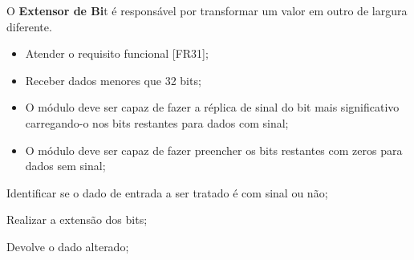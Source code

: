 O \textbf{Extensor de Bi}t é responsável por transformar um valor em outro de largura diferente.
  
\actors
	\begin{description}
	\end{description}
  
\preconditions 
	\begin{itemize}
	\item Atender o requisito funcional [FR31];
	\item Receber dados menores que 32 bits;
	\end{itemize}

\postconditions
    \begin{itemize}
     \item O módulo deve ser capaz de fazer a réplica de sinal do bit mais significativo carregando-o nos bits restantes para dados com sinal;
     \item O módulo deve ser capaz de fazer preencher os bits restantes com zeros para dados sem sinal;
     \end{itemize}
  
\begin{mainflow}
\item Identificar se o dado de entrada a ser tratado é com sinal ou não;
\item Realizar a extensão dos bits;
\item Devolve o dado alterado;
\end{mainflow}
  
